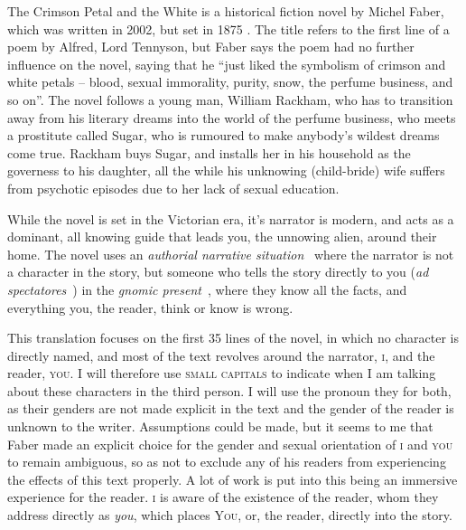 
The Crimson Petal and the White is a historical fiction novel by Michel Faber,
which was written in 2002, but set in 1875 \autocite{Guardian}. The title refers
to the first line of a poem by Alfred, Lord Tennyson, but Faber says the poem
had no further influence on the novel, saying that he ``just liked the symbolism
of crimson and white petals -- blood, sexual immorality, purity, snow, the
perfume business, and so on''\autocite{3am}. The novel follows a young man,
William Rackham, who has to transition away from his literary dreams into the
world of the perfume business, who meets a prostitute called Sugar, who is
rumoured to make anybody's wildest dreams come true. Rackham buys Sugar, and
installs her in his household as the governess to his daughter, all the while
his unknowing (child-bride) wife suffers from psychotic episodes due to her lack
of sexual education.

While the novel is set in the Victorian era, it's narrator is modern, and acts
as a dominant, all knowing guide that leads you, the unnowing alien, around
their home. The novel uses an \textit{authorial narrative
situation}~\autocite{basic} where the narrator is not a character in the story,
but someone who tells the story directly to you (\textit{ad
spectatores}~\autocite{basic}) in the \textit{gnomic present}~\autocite{basic},
where they know all the facts, and everything you, the reader, think or know is
wrong.


This translation focuses on the first 35 lines of the novel, in which no
character is directly named, and most of the text revolves around the narrator,
\textsc{i}, and the reader, \textsc{you}. I will therefore use \textsc{small
capitals} to indicate when I am talking about these characters in the third
person. I will use the pronoun they for both, as their genders are not made
explicit in the text and the gender of the reader is unknown to the writer.
Assumptions could be made, but it seems to me that Faber made an explicit choice
for the gender and sexual orientation of \textsc{i} and \textsc{you} to remain
ambiguous, so as not to exclude any of his readers from experiencing the effects
of this text properly. A lot of work is put into this being an immersive
experience for the reader. \textsc{i} is aware of the existence of the reader,
whom they address directly as \textit{you}, which places \textsc{You}, or, the
reader, directly into the story.


